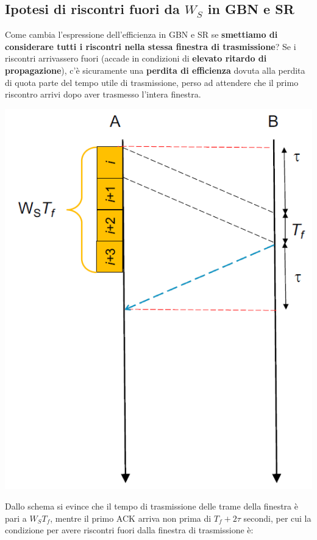 \documentclass[12pt]{article}
\begin{document}
\subsection{Ipotesi di riscontri fuori da $W_S$ in GBN e SR}

Come cambia l'espressione dell'efficienza in GBN e SR se \textbf{smettiamo di considerare tutti i riscontri nella stessa finestra di trasmissione}? Se i riscontri arrivassero fuori (accade in condizioni di \textbf{elevato ritardo di propagazione}), c'è sicuramente una \textbf{perdita di efficienza} dovuta alla perdita di quota parte del tempo utile di trasmissione, perso ad attendere che il primo riscontro arrivi dopo aver trasmesso l'intera finestra.
\begin{center}
    \includegraphics[scale=0.5]{selective_repeat_ack_out}
\end{center}
Dallo schema si evince che il tempo di trasmissione delle trame della finestra è pari a $W_ST_f$, mentre il primo ACK arriva non prima di $T_f+2\tau$ secondi, per cui la condizione per avere riscontri fuori dalla finestra di trasmissione è:
\end{document}
